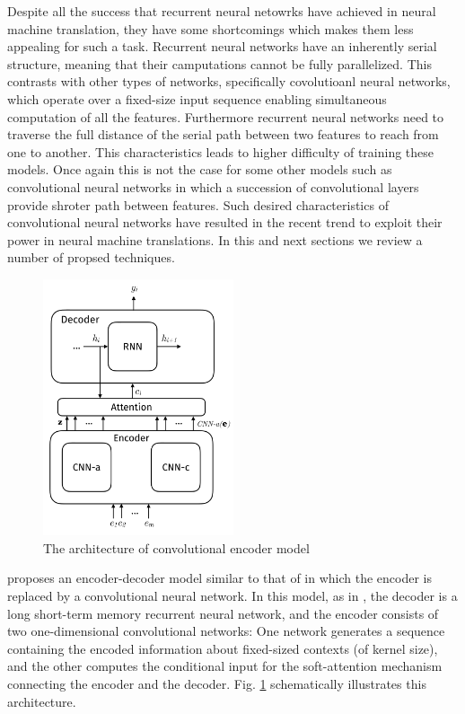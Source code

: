 \documentclass[a4paper]{article}
\begin{document}
Despite all the success that recurrent neural  netowrks  have achieved in neural
machine translation, they have some shortcomings which makes them less appealing
for such a task. Recurrent neural networks have an inherently serial  structure,
meaning that their  camputations  cannot  be  fully parallelized. This contrasts
with  other types of networks, specifically covolutioanl neural  networks, which
operate  over a  fixed-size input sequence enabling simultaneous computation  of
all the features. Furthermore  recurrent  neural networks need  to traverse  the
full distance of  the serial  path  between  two features  to reach from one  to
another. This characteristics  leads  to  higher  difficulty  of  training these
models. Once  again  this  is  not  the  case  for some  other  models  such  as
convolutional neural networks in  which  a succession  of  convolutional  layers
provide shroter  path  between features.  \cite{DBLP:journals/corr/GehringAGD16}
Such  desired characteristics  of convolutional neural networks have resulted in
the recent trend to exploit their power in neural machine  translations. In this
and next sections we review a number of propsed techniques.


\begin{figure}
  \center
  \includegraphics[width=0.5\textwidth]{img/CE}
  \caption{The architecture of convolutional encoder model}
  \label{fig:convenc}
\end{figure}


\citet{DBLP:journals/corr/GehringAGD16}   proposes   an   encoder-decoder  model
similar to that of \cite{bahdanau2014neural} in which the encoder is replaced by
a convolutional neural network. In this  model, as in \cite{bahdanau2014neural},
the decoder  is  a  long short-term  memory recurrent neural  network,  and  the
encoder consists of  two one-dimensional  convolutional  networks:  One  network
generates  a sequence  containing  the  encoded  information  about  fixed-sized
contexts (of kernel  size), and the other computes the conditional input for the
soft-attention  mechanism   connecting   the   encoder  and  the  decoder.  Fig.
\ref{fig:convenc} schematically illustrates this architecture.
\end{document}
